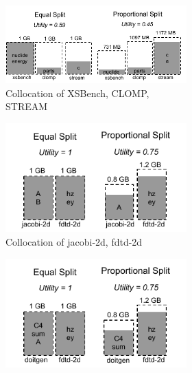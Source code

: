 \begin{figure}
   \begin{subfigure}{\linewidth}
  \begin{subfigure}{0.425\linewidth}
  \includegraphics[width=\linewidth]{figures/tiering1a.pdf}
      \captionsetup{labelformat=empty}
  \caption{Collocation of XSBench, CLOMP, STREAM}
    \end{subfigure}%
     \begin{subfigure}{0.3\linewidth}
  \includegraphics[width=\linewidth]{figures/tiering1b.pdf}
      \captionsetup{labelformat=empty}
    \caption{Collocation of jacobi-2d, fdtd-2d}
    \end{subfigure}%
     \begin{subfigure}{0.3\linewidth}
     \centering
  \includegraphics[width=\linewidth]{figures/tiering1c.pdf}

\end{subfigure}
\end{subfigure}
\end{figure}
